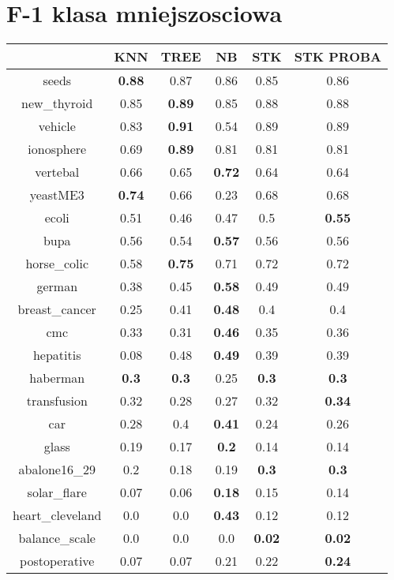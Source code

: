 \documentclass{article}%
\begin{document}
\section*{F{-}1 klasa mniejszosciowa}%
\begin{tabular}{c|ccccc}%
&KNN&TREE&NB&STK&STK PROBA\\%
\hline%
seeds&\textbf{0.88}&0.87&0.86&0.85&0.86\\%
new\_thyroid&0.85&\textbf{0.89}&0.85&0.88&0.88\\%
vehicle&0.83&\textbf{0.91}&0.54&0.89&0.89\\%
ionosphere&0.69&\textbf{0.89}&0.81&0.81&0.81\\%
vertebal&0.66&0.65&\textbf{0.72}&0.64&0.64\\%
yeastME3&\textbf{0.74}&0.66&0.23&0.68&0.68\\%
ecoli&0.51&0.46&0.47&0.5&\textbf{0.55}\\%
bupa&0.56&0.54&\textbf{0.57}&0.56&0.56\\%
horse\_colic&0.58&\textbf{0.75}&0.71&0.72&0.72\\%
german&0.38&0.45&\textbf{0.58}&0.49&0.49\\%
breast\_cancer&0.25&0.41&\textbf{0.48}&0.4&0.4\\%
cmc&0.33&0.31&\textbf{0.46}&0.35&0.36\\%
hepatitis&0.08&0.48&\textbf{0.49}&0.39&0.39\\%
haberman&\textbf{0.3}&\textbf{0.3}&0.25&\textbf{0.3}&\textbf{0.3}\\%
transfusion&0.32&0.28&0.27&0.32&\textbf{0.34}\\%
car&0.28&0.4&\textbf{0.41}&0.24&0.26\\%
glass&0.19&0.17&\textbf{0.2}&0.14&0.14\\%
abalone16\_29&0.2&0.18&0.19&\textbf{0.3}&\textbf{0.3}\\%
solar\_flare&0.07&0.06&\textbf{0.18}&0.15&0.14\\%
heart\_cleveland&0.0&0.0&\textbf{0.43}&0.12&0.12\\%
balance\_scale&0.0&0.0&0.0&\textbf{0.02}&\textbf{0.02}\\%
postoperative&0.07&0.07&0.21&0.22&\textbf{0.24}\\%
\end{tabular}

%
\end{document}
